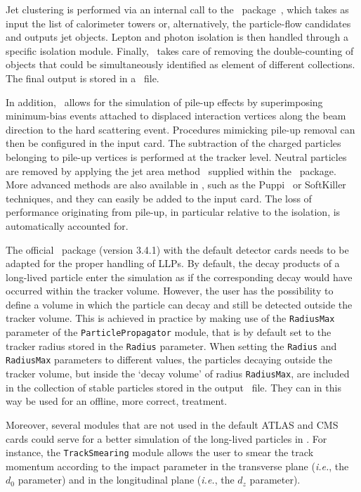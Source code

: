 Jet clustering is performed via an internal call to the \FJ\
package~\cite{Cacciari:2011ma}, which takes as input the
list of calorimeter towers or, alternatively, the particle-flow candidates and
outputs jet objects. Lepton and photon isolation is then handled through a
specific isolation module. Finally, \DEL\ takes care of removing the
double-counting of objects that could be simultaneously identified as element of
different collections. The final output is stored in a \ROOT\ file.

In addition, \DEL\ allows for the simulation of pile-up effects by
superimposing minimum-bias events attached to displaced interaction vertices
along the beam direction
to the hard scattering event. Procedures mimicking pile-up
removal can then be configured in the input card. The subtraction of the charged
particles belonging to pile-up vertices is performed at the tracker level.
Neutral particles are removed by applying the jet area
method~\cite{Cacciari:2007fd} supplied within the \FJ\ package. More advanced methods are also available in \DEL, such as the
{\sc Puppi}~\cite{Bertolini:2014bba} or {\sc SoftKiller}~\cite{Cacciari:2014gra}
techniques, and they can easily be added to the input card. The loss of
performance originating from pile-up, in particular relative to the isolation, is
automatically accounted for.

The official \DEL\ package (version 3.4.1) with the default detector cards needs
to be adapted for the proper handling of LLPs.
By default, the decay products of a long-lived particle enter the
simulation as if the corresponding decay would have occurred within the
tracker volume. However, the user has the possibility to define a volume in
which the particle can decay and still be detected outside the tracker volume. This is achieved in
practice by making use of the \verb+RadiusMax+ parameter of the
\verb+ParticlePropagator+ module, that is by default set to the tracker radius
stored in the \verb+Radius+ parameter. When setting the \verb+Radius+ and
\verb+RadiusMax+ parameters to different values, the particles decaying outside
the tracker volume, but inside the `decay volume' of radius \verb+RadiusMax+, are
included in the collection of stable particles stored in the output \ROOT\ file.
They can in this way be used for an offline, more correct, treatment.

Moreover, several modules that are not used in the default ATLAS and CMS cards
could serve for a better simulation of the long-lived particles in \DEL . For
instance, the \verb+TrackSmearing+ module allows the user to smear the track momentum
according to the impact parameter in the transverse plane ({\it i.e.}, the $d_0$
parameter) and in the longitudinal plane ({\it i.e.}, the $d_z$ parameter).

